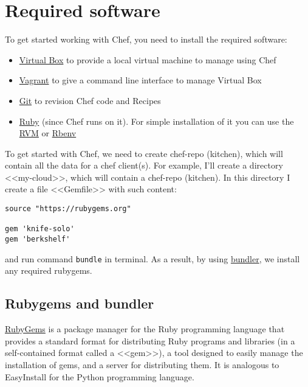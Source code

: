 \section{Required software}
\label{sec:solo-required}

To get started working with Chef, you need to install the required software:

\begin{itemize}
  \item \href{https://www.virtualbox.org/}{Virtual Box} to provide a local virtual machine to manage using Chef
  \item \href{http://www.vagrantup.com/}{Vagrant} to give a command line interface to manage Virtual Box
  \item \href{http://git-scm.com/}{Git} to revision Chef code and Recipes
  \item \href{https://www.ruby-lang.org}{Ruby} (since Chef runs on it). For simple installation of it you can use the \href{https://rvm.io/}{RVM} or \href{https://github.com/sstephenson/rbenv}{Rbenv}
\end{itemize}

To get started with Chef, we need to create chef-repo (kitchen), which will contain all the data for a chef client(s). For example, I'll create a directory <<my-cloud>>, which will contain a chef-repo (kitchen). In this directory I create a file <<Gemfile>> with such content:

\begin{lstlisting}[label=lst:my-cloud-required1,title=my-cloud/Gemfile]
source "https://rubygems.org"

gem 'knife-solo'
gem 'berkshelf'
\end{lstlisting}

and run command \lstinline!bundle! in terminal. As a result, by using \href{http://bundler.io/}{bundler}, we install any required rubygems.

\subsection{Rubygems and bundler}

\href{http://rubygems.org/}{RubyGems} is a package manager for the Ruby programming language that provides a standard format for distributing Ruby programs and libraries (in a self-contained format called a <<gem>>), a tool designed to easily manage the installation of gems, and a server for distributing them. It is analogous to EasyInstall for the Python programming language.

